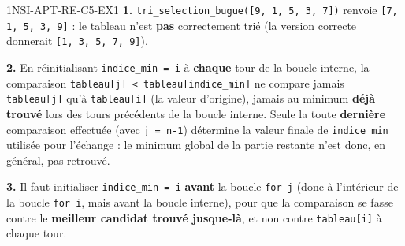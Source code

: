
\begin{corrige}{1NSI-APT-RE-C5-EX1}
\textbf{1.} \lstinline{tri_selection_bugue([9, 1, 5, 3, 7])} renvoie
\lstinline{[7, 1, 5, 3, 9]} : le tableau n'est \textbf{pas} correctement trié (la version
correcte donnerait \lstinline{[1, 3, 5, 7, 9]}).

\textbf{2.} En réinitialisant \lstinline{indice_min = i} à \textbf{chaque} tour de la
boucle interne, la comparaison \lstinline{tableau[j] < tableau[indice_min]} ne compare
jamais \lstinline{tableau[j]} qu'à \lstinline{tableau[i]} (la valeur d'origine), jamais au
minimum \textbf{déjà trouvé} lors des tours précédents de la boucle interne. Seule la toute
\textbf{dernière} comparaison effectuée (avec \lstinline{j = n-1}) détermine la valeur
finale de \lstinline{indice_min} utilisée pour l'échange : le minimum global de la partie
restante n'est donc, en général, pas retrouvé.

\textbf{3.} Il faut initialiser \lstinline{indice_min = i} \textbf{avant} la boucle
\lstinline{for j} (donc à l'intérieur de la boucle \lstinline{for i}, mais avant la boucle
interne), pour que la comparaison se fasse contre le \textbf{meilleur candidat trouvé
jusque-là}, et non contre \lstinline{tableau[i]} à chaque tour.
\end{corrige}

